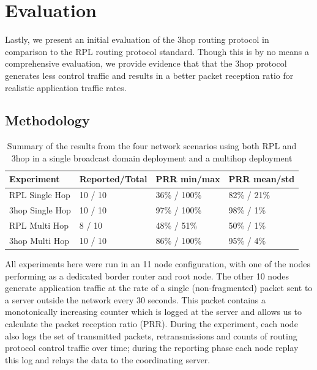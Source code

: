 \section{Evaluation} \label{section:evaluation}

Lastly, we present an initial evaluation of the 3hop routing protocol in comparison to the RPL routing protocol standard.
Though this is by no means a comprehensive evaluation, we provide evidence that that the 3hop protocol generates less control traffic and results in a better packet reception ratio for realistic application traffic rates.

\subsection{Methodology}

\begin{table}[t]
\centering
\caption{Summary of the results from the four network scenarios using both RPL and 3hop in a single broadcast domain deployment and a multihop deployment}
\label{table:results}
\begin{tabular}{|l|l|l|l|}
\hline
\textbf{Experiment} & \textbf{Reported/Total} & \textbf{PRR min/max} & \textbf{PRR mean/std} \\
\hline
\hline
RPL Single Hop & 10 / 10 & 36\% / 100\% & 82\% / 21\% \\
3hop Single Hop & 10 / 10 & 97\% / 100\% & 98\% / 1\% \\
RPL Multi Hop & 8 / 10 & 48\% / 51\% & 50\% / 1\% \\
3hop Multi Hop & 10 / 10 & 86\% / 100\% & 95\% / 4\% \\
\hline
\end{tabular}
\end{table}


All experiments here were run in an 11 node configuration, with one of the nodes performing as a dedicated border router and root node.
The other 10 nodes generate application traffic at the rate of a single (non-fragmented) packet sent to a server outside the network every 30 seconds.
This packet contains a monotonically increasing counter which is logged at the server and allows us to calculate the packet reception ratio (PRR).
During the experiment, each node also logs the set of transmitted packets, retransmissions and counts of routing protocol control traffic over time; during the reporting phase each node replay this log and relays the data to the coordinating server.

